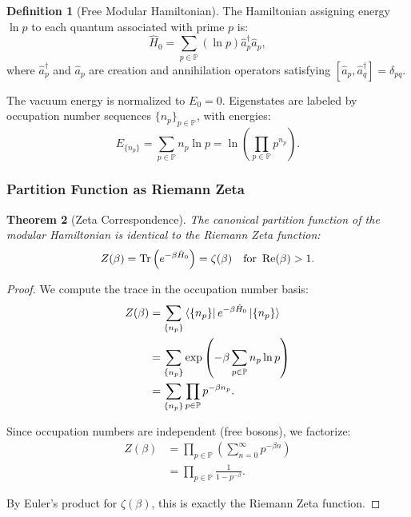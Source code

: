 \documentclass[11pt, a4paper]{article}
\theoremstyle{plain}
\newtheorem{theorem}{Theorem}[section]
\theoremstyle{definition}
\newtheorem{definition}[theorem]{Definition}
\begin{document}
\begin{definition}[Free Modular Hamiltonian]
The Hamiltonian assigning energy $\ln p$ to each quantum associated with prime $p$ is:
\begin{equation}
\hat{H}_0 = \sum_{p \in \mathbb{P}} (\ln p) \hat{a}_p^\dagger \hat{a}_p,
\label{eq:hamiltonian_modular}
\end{equation}
where $\hat{a}_p^\dagger$ and $\hat{a}_p$ are creation and annihilation operators satisfying $[\hat{a}_p, \hat{a}_q^\dagger] = \delta_{pq}$.
\end{definition}

The vacuum energy is normalized to $E_0 = 0$. Eigenstates are labeled by occupation number sequences $\{n_p\}_{p \in \mathbb{P}}$, with energies:
\begin{equation}
E_{\{n_p\}} = \sum_{p \in \mathbb{P}} n_p \ln p = \ln\left(\prod_{p \in \mathbb{P}} p^{n_p}\right).
\end{equation}

\subsubsection{Partition Function as Riemann Zeta}

\begin{theorem}[Zeta Correspondence]
The canonical partition function of the modular Hamiltonian is identical to the Riemann Zeta function:
\begin{equation}
Z(\beta) = \Tr\left(e^{-\beta \hat{H}_0}\right) = \zeta(\beta) \quad \text{for } \Re(\beta) > 1.
\label{eq:zeta_correspondence}
\end{equation}
\end{theorem}

\begin{proof}
We compute the trace in the occupation number basis:
\begin{align*}
Z(\beta) &= \sum_{\{n_p\}} \bra{\{n_p\}} e^{-\beta \hat{H}_0} \ket{\{n_p\}} \\
&= \sum_{\{n_p\}} \exp\left(-\beta \sum_{p \in \mathbb{P}} n_p \ln p\right) \\
&= \sum_{\{n_p\}} \prod_{p \in \mathbb{P}} p^{-\beta n_p}.
\end{align*}

Since occupation numbers are independent (free bosons), we factorize:
\begin{align*}
Z(\beta) &= \prod_{p \in \mathbb{P}} \left( \sum_{n=0}^\infty p^{-\beta n} \right) \\
&= \prod_{p \in \mathbb{P}} \frac{1}{1 - p^{-\beta}}.
\end{align*}

By Euler's product for $\zeta(\beta)$, this is exactly the Riemann Zeta function.
\end{proof}
\end{document}

